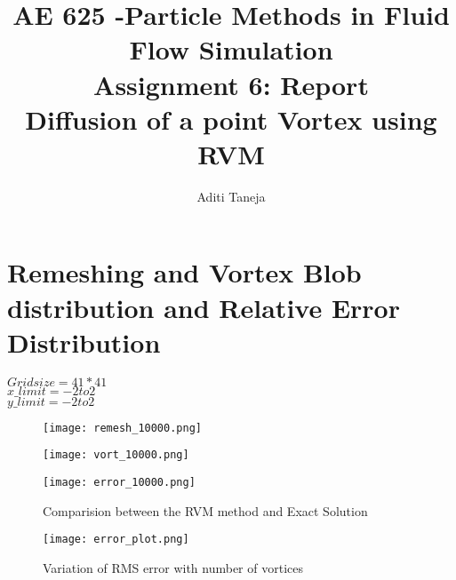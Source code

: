 \documentclass{article}
\title{AE 625 -Particle Methods in Fluid Flow Simulation \\ Assignment 6: Report \\ Diffusion of a point Vortex using RVM}
\author{Aditi Taneja}
\date{}
\begin{document}
\maketitle

\section*{Remeshing and Vortex Blob distribution and Relative Error Distribution}
$Grid size =  41*41 $ 
\\
$x\_limit  = -2 to 2$
\\
$y\_limit = -2 to 2$


\begin{figure}[H]   \label{figure}
\texttt{[image: remesh\_10000.png]}
\label{figure:}
\end{figure}

\begin{figure}[H] \label{figure}
\texttt{[image: vort\_10000.png]}
\label{figure:}
\end{figure}

\begin{figure}[H] \label{figure}
\texttt{[image: error\_10000.png]}
\caption{Comparision between the RVM method and Exact Solution}
\label{figure:}
\end{figure}


\begin{figure}[H] \label{figure}
\texttt{[image: error\_plot.png]}
\caption{Variation of RMS error with number of vortices}
\label{figure:}
\end{figure}
\end{document}
